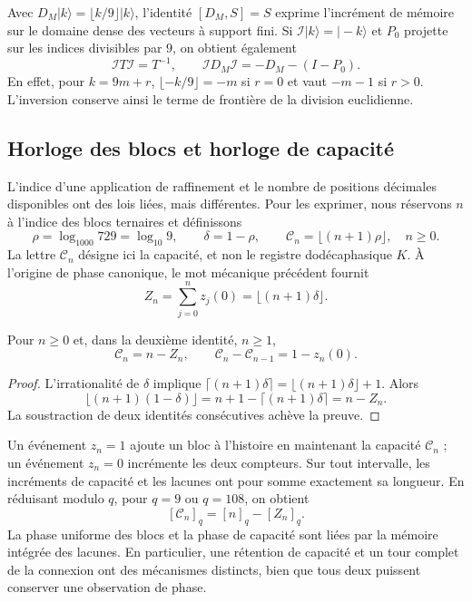 Avec \(D_M|k\rangle=\lfloor k/9\rfloor|k\rangle\), l'identité
\([D_M,S]=S\) exprime l'incrément de mémoire sur le domaine dense des
vecteurs à support fini. Si \(\mathcal I|k\rangle=|-k\rangle\) et
\(P_0\) projette sur les indices divisibles par \(9\), on obtient
également
\begin{equation}
 \mathcal I T\mathcal I=T^{-1},\qquad
 \mathcal I D_M\mathcal I=-D_M-(I-P_0).
 \label{mono-ampl:inversion-contador}
\end{equation}
En effet, pour \(k=9m+r\),
\(\lfloor-k/9\rfloor=-m\) si \(r=0\) et vaut \(-m-1\) si \(r>0\).
L'inversion conserve ainsi le terme de frontière de la division euclidienne.

\subsection{Horloge des blocs et horloge de capacité}
\label{mono-ampl:relojes}

L'indice d'une application de raffinement et le nombre de positions
décimales disponibles ont des lois liées, mais différentes. Pour
les exprimer, nous réservons \(n\) à l'indice des blocs ternaires et définissons
\[
 \rho=\log_{1000}729=\log_{10}9,\qquad
 \delta=1-\rho,\qquad
 \mathcal C_n=\lfloor(n+1)\rho\rfloor,\quad n\geq0.
\]
La lettre \(\mathcal C_n\) désigne ici la capacité, et non le registre
dodécaphasique \(K\). À l'origine de phase canonique, le mot mécanique
précédent fournit
\[
 Z_n=\sum_{j=0}^{n}z_j(0)=\lfloor(n+1)\delta\rfloor.
\]

\begin{proposition}
\label{mono-ampl:balance-capacidad}
Pour \(n\geq0\) et, dans la deuxième identité, \(n\geq1\),
\[
 \mathcal C_n=n-Z_n,\qquad
 \mathcal C_n-\mathcal C_{n-1}=1-z_n(0).
\]
\end{proposition}
\begin{proof}
L'irrationalité de \(\delta\) implique
\(\lceil(n+1)\delta\rceil=\lfloor(n+1)\delta\rfloor+1\).
Alors
\[
 \lfloor(n+1)(1-\delta)\rfloor
 =n+1-\lceil(n+1)\delta\rceil=n-Z_n.
\]
La soustraction de deux identités consécutives achève la preuve.
\end{proof}

Un événement \(z_n=1\) ajoute un bloc à l'histoire en maintenant la capacité
\(\mathcal C_n\) ; un événement \(z_n=0\) incrémente les deux compteurs. Sur
tout intervalle, les incréments de capacité et les lacunes ont pour somme
exactement sa longueur. En réduisant modulo \(q\), pour \(q=9\) ou
\(q=108\), on obtient
\[
 [\mathcal C_n]_q=[n]_q-[Z_n]_q.
\]
La phase uniforme des blocs et la phase de capacité sont liées par
la mémoire intégrée des lacunes. En particulier, une rétention de
capacité et un tour complet de la connexion ont des mécanismes
distincts, bien que tous deux puissent conserver une observation de phase.

